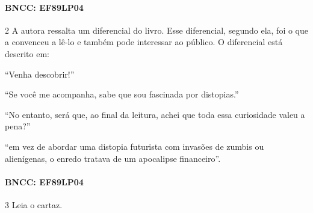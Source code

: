
\paragraph{BNCC: EF89LP04} 
\break


\num{2} A autora ressalta um diferencial do livro. Esse diferencial,
segundo ela, foi o que a convenceu a lê-lo e também pode interessar ao
público. O diferencial está descrito em:

\begin{escolha}
\item ``Venha descobrir!''

\item ``Se você me acompanha, sabe que sou fascinada por distopias.''

\item ``No entanto, será que, ao final da leitura, achei que toda essa
curiosidade valeu a pena?''

\item ``em vez de abordar uma distopia futurista com invasões de zumbis ou
alienígenas, o enredo tratava de um apocalipse financeiro''.
\end{escolha}


\paragraph{BNCC: EF89LP04}
\break

\num{3} Leia o cartaz.


